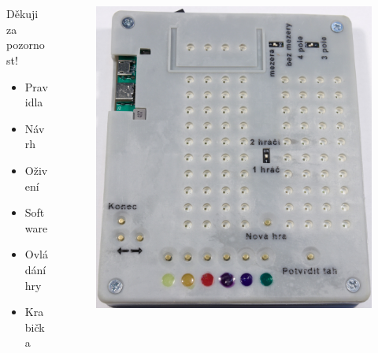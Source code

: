 \documentclass[%
  12pt,       				%
	t,                  %
	aspectratio=1610,   %
	unicode,						%
]{beamer}				    	%
\begin{document}
\begin{frame} 
	\frametitle{\mbox{ }}
	\begin{columns}[T] %
		\begin{column}{0.3\textwidth}		%
			\vspace{0.7cm}
			\centering
			{\Huge Děkuji za pozornost!}
			\vspace{0.7cm}
			\begin{itemize}
				\item Pravidla
				\item Návrh
				\item Oživení
				\item Software
				\item Ovládání hry
				\item Krabička
			\end{itemize}
		\end{column}
		\begin{column}{0.7\textwidth}		%
			\begin{figure}%
				\centering
				\includegraphics[width=0.6\columnwidth]{obrazky/Kompletace.jpg}
			\end{figure}
		\end{column}
	\end{columns}	
\end{frame}
\end{document}
